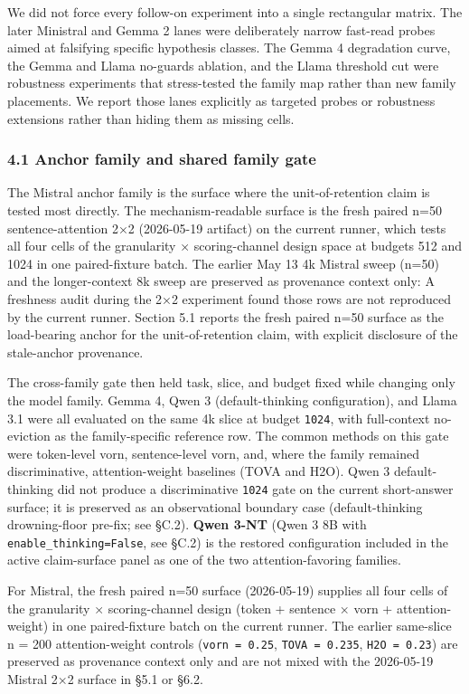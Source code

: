 \documentclass[
]{article}
\begin{document}
We did not force every follow-on experiment into a single rectangular
matrix. The later Ministral and Gemma 2 lanes were deliberately
narrow fast-read probes aimed at falsifying specific hypothesis classes.
The Gemma 4 degradation curve, the Gemma and Llama no-guards ablation,
and the Llama threshold cut were robustness experiments that
stress-tested the family map rather than new family placements. We
report those lanes explicitly as targeted probes or robustness
extensions rather than hiding them as missing cells.

\subsubsection{4.1 Anchor family and shared family
gate}\label{41-anchor-family-and-shared-family-gate}

The Mistral anchor family is the surface where the
unit-of-retention claim is tested most directly. The mechanism-readable
surface is the fresh paired n=50 sentence-attention 2×2 (2026-05-19
artifact) on the current runner, which tests all four cells of the
granularity × scoring-channel design space at budgets 512 and 1024 in
one paired-fixture batch. The earlier May 13 4k Mistral sweep (n=50) and
the longer-context 8k sweep are preserved as provenance context only: A
freshness audit during the 2×2 experiment found those rows are not
reproduced by the current runner. Section 5.1 reports the fresh paired
n=50 surface as the load-bearing anchor for the unit-of-retention claim,
with explicit disclosure of the stale-anchor provenance.

The cross-family gate then held task, slice, and budget fixed while
changing only the model family. Gemma 4, Qwen 3 (default-thinking
configuration), and Llama 3.1 were all evaluated on the same 4k slice
at budget \texttt{1024}, with full-context no-eviction as the
family-specific reference row. The common methods on this gate were
token-level vorn, sentence-level vorn, and, where the family remained
discriminative, attention-weight baselines (TOVA and H2O). Qwen 3
default-thinking did not produce a discriminative \texttt{1024} gate
on the current short-answer surface; it is preserved as an
observational boundary case (default-thinking drowning-floor pre-fix;
see §C.2). \textbf{Qwen 3-NT} (Qwen 3 8B with
\texttt{enable\_thinking=False}, see §C.2) is the restored
configuration included in the active claim-surface panel as one of the
two attention-favoring families.

For Mistral, the fresh paired n=50 surface (2026-05-19) supplies all
four cells of the granularity × scoring-channel design (token + sentence
× vorn + attention-weight) in one paired-fixture batch on
the current runner. The earlier same-slice n = 200 attention-weight
controls (\texttt{vorn\ =\ 0.25}, \texttt{TOVA\ =\ 0.235},
\texttt{H2O\ =\ 0.23}) are preserved as provenance context only
and are not mixed with the 2026-05-19 Mistral 2×2 surface in §5.1 or
§6.2.
\end{document}

